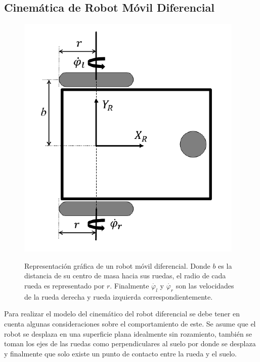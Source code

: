 
\subsection{Cinem\'atica de Robot M\'ovil Diferencial}
\begin{figure}%
\centering \footnotesize
{\includegraphics[width=0.40\linewidth]{images/kinematic_model.png}}
\captionsetup{font=footnotesize}
\caption{Representaci\'on gr\'afica de un robot m\'ovil diferencial. Donde 
$b$ es la distancia de su centro de masa hacia sus ruedas, el radio de cada 
rueda es representado por $r$. Finalmente $\dot{\varphi_{l}}$ y 
$\dot{\varphi_{r}}$ son las velocidades de la rueda derecha y rueda izquierda 
correspondientemente.}
\label{fig:RMkinematic}
\end{figure}
Para realizar el modelo del cinem\'atico del robot diferencial se debe tener 
en cuenta algunas consideraciones sobre el comportamiento de este. Se asume 
que el robot se desplaza en una superficie plana idealmente sin rozamiento, 
tambi\'en se toman los ejes de las ruedas como perpendiculares al suelo
por donde se desplaza y finalmente que solo existe un punto de contacto entre 
la rueda y el suelo.


